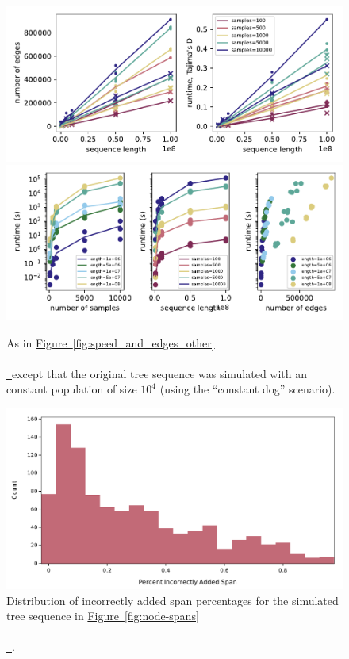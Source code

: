 \documentclass[10pt,twoside,lineno]{gsajnl}
\newcommand*{\figref}[2][]{%
	\hyperref[{#2}]{%
		Figure~\ref*{#2}%
		\ifx\\#1\\%
		\else
		\,#1%
		\fi
	}%
}
\begin{document}
\begin{figure}
    \includegraphics{benchmarks/constant_pop_results_absolute_values}
    \includegraphics{benchmarks/constant_pop_results_timing}
    \caption{
        As in \figref{fig:speed_and_edges_other} except that
        the original tree sequence was simulated with an constant population
        of size $10^4$ (using the ``constant dog'' scenario).
        \label{fig:speed_and_edges_other_constant}
    }
\end{figure}

\begin{figure}[!hbt]
	\includegraphics[width=\textwidth]{figures/Figure4S-plt-nonzero.pdf}
	\caption{Distribution of incorrectly added span percentages
		for the simulated tree sequence in \figref{fig:node-spans}.}
	\label{fig:incorrect_ratio}
\end{figure}
\end{document}
